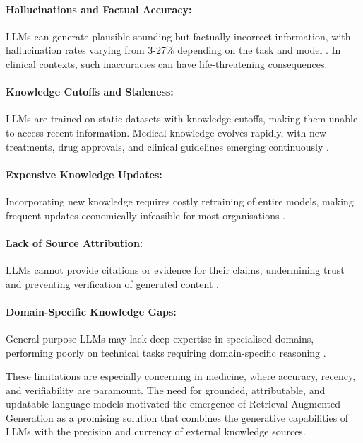 \paragraph{Hallucinations and Factual Accuracy:} LLMs can generate plausible-sounding but factually incorrect information, with hallucination rates varying from 3-27\% depending on the task and model \citep{zhang2023sirens}. In clinical contexts, such inaccuracies can have life-threatening consequences.

\paragraph{Knowledge Cutoffs and Staleness:} LLMs are trained on static datasets with knowledge cutoffs, making them unable to access recent information. Medical knowledge evolves rapidly, with new treatments, drug approvals, and clinical guidelines emerging continuously \citep{rogers2023prompt}.

\paragraph{Expensive Knowledge Updates:} Incorporating new knowledge requires costly retraining of entire models, making frequent updates economically infeasible for most organisations \citep{zhu2020modifying}.

\paragraph{Lack of Source Attribution:} LLMs cannot provide citations or evidence for their claims, undermining trust and preventing verification of generated content \citep{rashkin2021measuring}.

\paragraph{Domain-Specific Knowledge Gaps:} General-purpose LLMs may lack deep expertise in specialised domains, performing poorly on technical tasks requiring domain-specific reasoning \citep{hendrycks2021measuring}.

These limitations are especially concerning in medicine, where accuracy, recency, and verifiability are paramount. The need for grounded, attributable, and updatable language models motivated the emergence of Retrieval-Augmented Generation as a promising solution that combines the generative capabilities of LLMs with the precision and currency of external knowledge sources.

